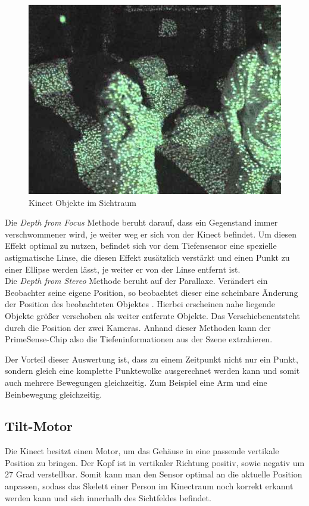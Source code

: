 	\begin{figure}[H]						
		\centering							
		\includegraphics[scale=0.5]{Bilder/kinect_dots_green.jpg}			
		\caption{Kinect Objekte im Sichtraum}						
		\label{f:kinect_dots_with_Object}						
	\end{figure}
	
	\noindent
Die \textit{Depth from Focus} Methode beruht darauf, dass ein Gegenstand immer verschwommener wird, je weiter weg er sich von der Kinect befindet. Um diesen Effekt optimal zu nutzen, befindet sich vor dem Tiefensensor eine spezielle astigmatische Linse, die diesen Effekt zusätzlich verstärkt und einen Punkt zu einer Ellipse werden lässt, je weiter er von der Linse entfernt ist.\cite{pdf:maccormick}	\\
Die \textit{Depth from Stereo} Methode beruht auf der Parallaxe. Verändert ein Beobachter seine eigene Position, so beobachtet dieser eine scheinbare Änderung der Position des beobachteten Objektes \cite{ws:wikiparallaxe}. Hierbei erscheinen nahe liegende Objekte größer verschoben als weiter entfernte Objekte. Das \glqq Verschieben\grqq entsteht durch die Position der zwei Kameras. Anhand dieser Methoden kann der PrimeSense-Chip also die Tiefeninformationen aus der Szene extrahieren.	
	
Der Vorteil dieser Auswertung ist, dass zu einem Zeitpunkt nicht nur ein Punkt, sondern gleich eine komplette Punktewolke ausgerechnet werden kann und somit auch mehrere Bewegungen gleichzeitig. Zum Beispiel eine Arm und eine Beinbewegung gleichzeitig.
	
	
	
\subsection{Tilt-Motor}
	Die Kinect besitzt einen Motor, um das Gehäuse in eine passende vertikale Position zu bringen.
	Der Kopf ist in vertikaler Richtung positiv, sowie negativ um 27 Grad verstellbar. Somit kann
	man den Sensor optimal an die aktuelle Position anpassen, sodass das Skelett einer Person im
	Kinectraum noch korrekt erkannt werden kann und sich innerhalb des Sichtfeldes befindet.
	\cite{jana2012kinect}
	
